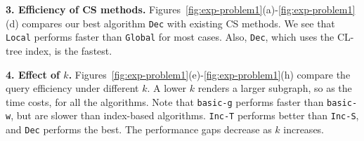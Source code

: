 {%
%
%

}

\textbf{3. Efficiency of CS methods.}
Figures~\ref{fig:exp-problem1}(a)-\ref{fig:exp-problem1}(d) compares our best algorithm {\tt Dec} with existing CS methods. We see that {\tt Local} performs faster than {\tt Global} for most cases. Also, {\tt Dec}, which uses the CL-tree index, is the fastest.

\textbf{4. Effect of $k$.}
Figures~\ref{fig:exp-problem1}(e)-\ref{fig:exp-problem1}(h)
compare the query efficiency under different $k$.
A lower $k$ renders a larger subgraph, so as the time costs, for all the algorithms.
Note that {\tt basic-g} performs faster than {\tt basic-w}, but are slower than index-based algorithms.
{\tt Inc-T} performs better than {\tt Inc-S}, and {\tt Dec} performs the best.
The performance gaps decrease as $k$ increases.

